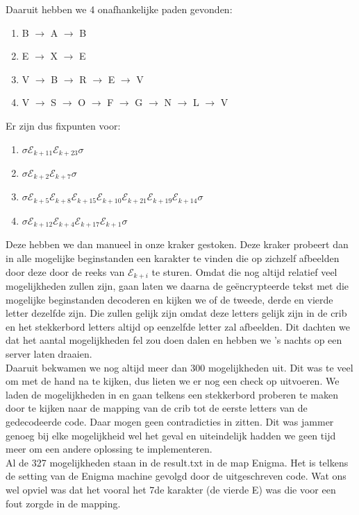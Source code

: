 \documentclass[fleqn]{article}
\begin{document}
	Daaruit hebben we 4 onafhankelijke paden gevonden:
	\begin{enumerate}
		\item B $\rightarrow$ A $\rightarrow$ B
		\item E $\rightarrow$ X $\rightarrow$ E
		\item V $\rightarrow$ B $\rightarrow$ R $\rightarrow$ E $\rightarrow$ V
		\item V $\rightarrow$ S $\rightarrow$ O $\rightarrow$ F $\rightarrow$ G $\rightarrow$ N $\rightarrow$ L $\rightarrow$ V
	\end{enumerate}

	Er zijn dus fixpunten voor:
	\begin{enumerate}
		\item $\sigma \mathcal{E}_{k+11} \mathcal{E}_{k+23} \sigma$
		\item $\sigma \mathcal{E}_{k+2} \mathcal{E}_{k+7} \sigma$
		\item $\sigma \mathcal{E}_{k+5} \mathcal{E}_{k+8} \mathcal{E}_{k+15} \mathcal{E}_{k+10} \mathcal{E}_{k+21} \mathcal{E}_{k+19} \mathcal{E}_{k+14}\sigma$
		\item $\sigma \mathcal{E}_{k+12} \mathcal{E}_{k+4} \mathcal{E}_{k+17} \mathcal{E}_{k+1} \sigma$
	\end{enumerate}

	Deze hebben we dan manueel in onze kraker gestoken. Deze kraker probeert dan in alle mogelijke beginstanden een karakter te vinden die op zichzelf afbeelden door deze door de reeks van $\mathcal{E}_{k+i}$ te sturen. Omdat die nog altijd relatief veel mogelijkheden zullen zijn, gaan laten we daarna de ge\"{e}ncrypteerde tekst met die mogelijke beginstanden decoderen en kijken we of de tweede, derde en vierde letter dezelfde zijn. Die zullen gelijk zijn omdat deze letters gelijk zijn in de crib en het stekkerbord letters altijd op eenzelfde letter zal afbeelden. Dit dachten we dat het aantal mogelijkheden fel zou doen dalen en hebben we 's nachts op een server laten draaien.\\
	Daaruit bekwamen we nog altijd meer dan 300 mogelijkheden uit. Dit was te veel om met de hand na te kijken, dus lieten we er nog een check op uitvoeren.
	We laden de mogelijkheden in en gaan telkens een stekkerbord proberen te maken door te kijken naar de mapping van de crib tot de eerste letters van de gedecodeerde code. Daar mogen geen contradicties in zitten. Dit was jammer genoeg bij elke mogelijkheid wel het geval en uiteindelijk hadden we geen tijd meer om een andere oplossing te implementeren.
	\\
	Al de 327 mogelijkheden staan in de result.txt in de map Enigma. Het is telkens de setting van de Enigma machine gevolgd door de uitgeschreven code. Wat ons wel opviel was dat het vooral het 7de karakter (de vierde E) was die voor een fout zorgde in de mapping.
	
	
\end{document}
